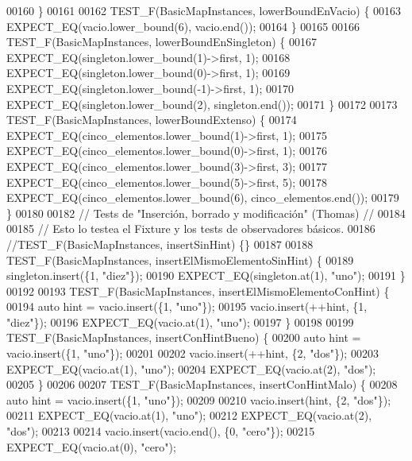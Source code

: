 \begin{DoxyCode}
00160 \}
00161 
00162 TEST\_F(BasicMapInstances, lowerBoundEnVacio) \{
00163     EXPECT\_EQ(vacio.lower\_bound(6), vacio.end());
00164 \}
00165 
00166 TEST\_F(BasicMapInstances, lowerBoundEnSingleton) \{
00167     EXPECT\_EQ(singleton.lower\_bound(1)->first, 1);
00168     EXPECT\_EQ(singleton.lower\_bound(0)->first, 1);
00169     EXPECT\_EQ(singleton.lower\_bound(-1)->first, 1);
00170     EXPECT\_EQ(singleton.lower\_bound(2), singleton.end());
00171 \}
00172 
00173 TEST\_F(BasicMapInstances, lowerBoundExtenso) \{
00174     EXPECT\_EQ(cinco\_elementos.lower\_bound(1)->first, 1);
00175     EXPECT\_EQ(cinco\_elementos.lower\_bound(0)->first, 1);
00176     EXPECT\_EQ(cinco\_elementos.lower\_bound(3)->first, 3);
00177     EXPECT\_EQ(cinco\_elementos.lower\_bound(5)->first, 5);
00178     EXPECT\_EQ(cinco\_elementos.lower\_bound(6), cinco\_elementos.end());
00179 \}
00180 
00182 \textcolor{comment}{// Tests de "Inserción, borrado y modificación" (Thomas) //}
00184 \textcolor{comment}{}
00185 \textcolor{comment}{// Esto lo testea el Fixture y los tests de observadores básicos.}
00186 \textcolor{comment}{//TEST\_F(BasicMapInstances, insertSinHint) \{\}}
00187 
00188 TEST\_F(BasicMapInstances, insertElMismoElementoSinHint) \{
00189     singleton.insert(\{1, \textcolor{stringliteral}{"diez"}\});
00190     EXPECT\_EQ(singleton.at(1), \textcolor{stringliteral}{"uno"});
00191 \}
00192 
00193 TEST\_F(BasicMapInstances, insertElMismoElementoConHint) \{
00194     \textcolor{keyword}{auto} hint = vacio.insert(\{1, \textcolor{stringliteral}{"uno"}\});
00195     vacio.insert(++hint, \{1, \textcolor{stringliteral}{"diez"}\});
00196     EXPECT\_EQ(vacio.at(1), \textcolor{stringliteral}{"uno"});
00197 \}
00198 
00199 TEST\_F(BasicMapInstances, insertConHintBueno) \{
00200     \textcolor{keyword}{auto} hint = vacio.insert(\{1, \textcolor{stringliteral}{"uno"}\});
00201 
00202     vacio.insert(++hint, \{2, \textcolor{stringliteral}{"dos"}\});
00203     EXPECT\_EQ(vacio.at(1), \textcolor{stringliteral}{"uno"});
00204     EXPECT\_EQ(vacio.at(2), \textcolor{stringliteral}{"dos"});
00205 \}
00206 
00207 TEST\_F(BasicMapInstances, insertConHintMalo) \{
00208     \textcolor{keyword}{auto} hint = vacio.insert(\{1, \textcolor{stringliteral}{"uno"}\});
00209 
00210     vacio.insert(hint, \{2, \textcolor{stringliteral}{"dos"}\});
00211     EXPECT\_EQ(vacio.at(1), \textcolor{stringliteral}{"uno"});
00212     EXPECT\_EQ(vacio.at(2), \textcolor{stringliteral}{"dos"});
00213 
00214     vacio.insert(vacio.end(), \{0, \textcolor{stringliteral}{"cero"}\});
00215     EXPECT\_EQ(vacio.at(0), \textcolor{stringliteral}{"cero"});

\end{DoxyCode}
